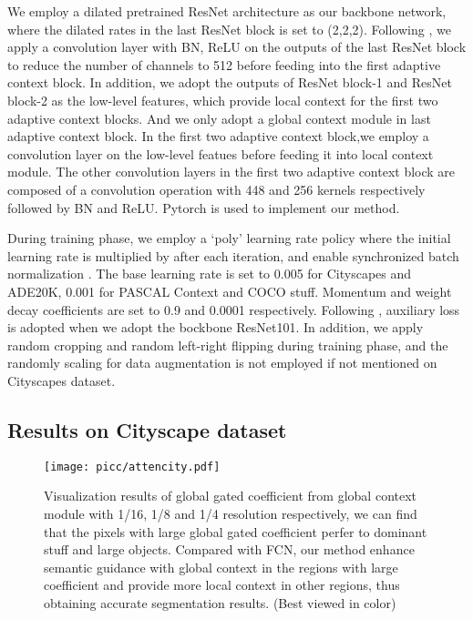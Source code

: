 \documentclass[10pt,twocolumn,letterpaper]{article}
\begin{document}
 We employ a dilated pretrained ResNet architecture as our backbone network, where the dilated rates in the last ResNet block is set to (2,2,2). 
Following \cite{encnet,pspnet}, we  apply a  convolution layer with BN, ReLU on the outputs of the last ResNet block to reduce the number of channels to 512 before feeding into the first adaptive context block.
In addition, we adopt the outputs of ResNet block-1 and ResNet block-2 as the low-level features, which provide local context for  the first two adaptive context blocks. And we only adopt a global context module in last adaptive context block. In the first two adaptive context block,we employ a  convolution layer on  the low-level featues before feeding it into local context module. The other convolution layers in the first two adaptive context block are composed of a  convolution operation with 448 and 256 kernels respectively followed by BN and ReLU. Pytorch is used to implement our method.

During training phase, we employ a ‘poly’ learning rate policy where
the initial learning rate is multiplied by  after each iteration, and enable synchronized batch normalization \cite{encnet}. The base learning rate is set to 0.005 for Cityscapes and  ADE20K, 0.001  for PASCAL Context and COCO stuff. Momentum and weight decay  coefficients are set to 0.9 and 0.0001 respectively. Following \cite{pspnet}, auxiliary loss is adopted when we adopt the bockbone ResNet101.
In addition, we apply  random cropping and random left-right flipping during training phase, and the randomly scaling for data  augmentation is not employed if not mentioned on Cityscapes dataset.




\subsection{Results on Cityscape dataset}



\begin{figure*}[!t]
        \centering
        \texttt{[image: picc/attencity.pdf]}
        \caption{Visualization results of global gated coefficient from
global context module with 1/16, 1/8 and 1/4 resolution respectively, we can find that the  pixels with large global gated coefficient perfer to dominant stuff and large objects. Compared with FCN, our method enhance semantic guidance with global context in the regions with large coefficient and provide more local context in other regions, thus obtaining accurate segmentation results. (Best viewed in color) }
         \label{attencity}\end{figure*}
\end{document}
